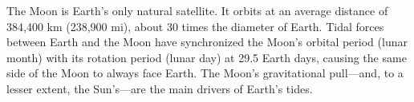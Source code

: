 The Moon is Earth's only natural satellite. It orbits at an average distance of 384,400 km (238,900 mi), about 30 times the diameter of Earth. Tidal forces between Earth and the Moon have synchronized the Moon's orbital period (lunar month) with its rotation period (lunar day) at 29.5 Earth days, causing the same side of the Moon to always face Earth. The Moon's gravitational pull—and, to a lesser extent, the Sun's—are the main drivers of Earth's tides.
